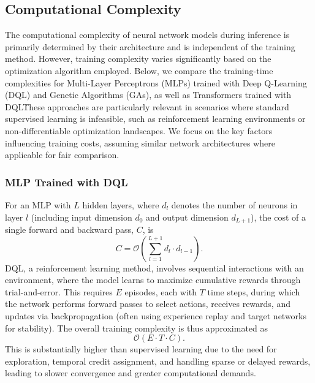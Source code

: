 \documentclass[preprint,3p,authoryear]{elsarticle}
\begin{document}
\subsection{Computational Complexity}

The computational complexity of neural network models during inference is primarily determined by their architecture and is independent of the training method. However, training complexity varies significantly based on the optimization algorithm employed. Below, we compare the training-time complexities for Multi-Layer Perceptrons (MLPs) trained with Deep Q-Learning (DQL) and Genetic Algorithms (GAs), as well as Transformers trained with DQL\. These approaches are particularly relevant in scenarios where standard supervised learning is infeasible, such as reinforcement learning environments or non-differentiable optimization landscapes. We focus on the key factors influencing training costs, assuming similar network architectures where applicable for fair comparison.

\subsubsection{MLP Trained with DQL}
For an MLP with $L$ hidden layers, where $d_l$ denotes the number of neurons in layer $l$ (including input dimension $d_0$ and output dimension $d_{L+1}$), the cost of a single forward and backward pass, $C$, is
\[
C = \mathcal{O}\!\left( \sum_{l=1}^{L+1} d_l \cdot d_{l-1} \right).
\]
DQL, a reinforcement learning method, involves sequential interactions with an environment, where the model learns to maximize cumulative rewards through trial-and-error. This requires $E$ episodes, each with $T$ time steps, during which the network performs forward passes to select actions, receives rewards, and updates via backpropagation (often using experience replay and target networks for stability). The overall training complexity is thus approximated as
\[
\mathcal{O}(E \cdot T \cdot C).
\]
This is substantially higher than supervised learning due to the need for exploration, temporal credit assignment, and handling sparse or delayed rewards, leading to slower convergence and greater computational demands.
\end{document}
